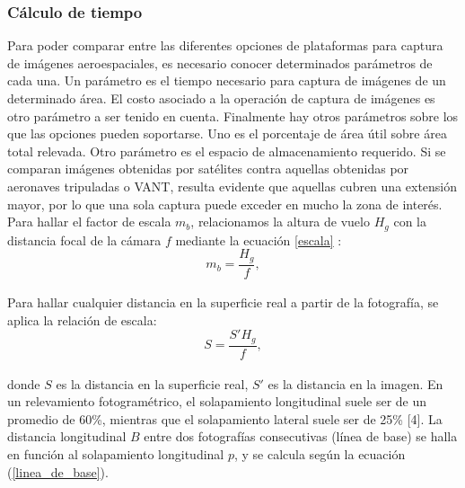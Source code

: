 \subsubsection{Cálculo de tiempo}
Para poder comparar entre las diferentes opciones de plataformas para captura de imágenes aeroespaciales, es necesario conocer determinados parámetros de cada una. Un parámetro es el tiempo necesario para captura de imágenes de un determinado área. El costo asociado a la operación de captura de imágenes es otro parámetro a ser tenido en cuenta. Finalmente hay otros parámetros sobre los que las opciones pueden soportarse. Uno es el porcentaje de área útil sobre área total relevada. Otro parámetro es el espacio de almacenamiento requerido.
Si se comparan imágenes obtenidas por satélites contra aquellas obtenidas por aeronaves tripuladas o VANT, resulta evidente que aquellas cubren una extensión mayor, por lo que una sola captura puede exceder en mucho la zona de interés. 
Para hallar el factor de escala $m_b$, relacionamos la altura de vuelo $H_g$ con la distancia focal
de la cámara $f$ mediante la ecuación \ref{escala} \cite{linder_digital_2016}:
\\
\begin{equation}
	m_b=\frac{H_g}{f},\label{escala}
\end{equation}
\\
Para hallar cualquier distancia en la superficie real a partir de la fotografía, se aplica la relación de escala:
\\
\begin{equation}
	S=\frac{S'H_g}{f},\label{escala1}
\end{equation}
\\
donde $S$ es la distancia en la superficie real, $S'$ es la distancia en la imagen.
En un relevamiento fotogramétrico, el solapamiento longitudinal suele ser de un promedio de 60\%, mientras que el solapamiento lateral suele ser de 25\% [4]. La distancia longitudinal $B$ entre dos fotografías consecutivas (línea de base) se halla en función al solapamiento longitudinal $p$, y se calcula según la ecuación (\ref{linea_de_base}).
